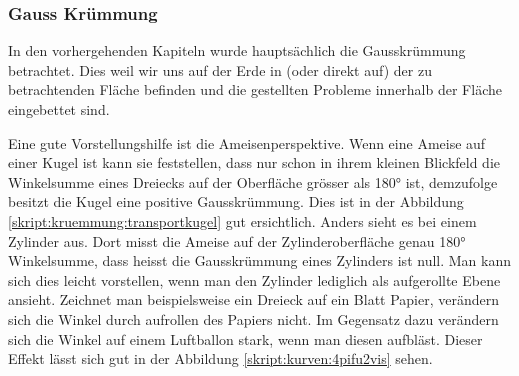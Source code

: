 \begin{refsection}




\subsubsection{Gauss Krümmung}
%
%
%
In den vorhergehenden Kapiteln wurde hauptsächlich die Gausskrümmung betrachtet.
Dies weil wir uns auf der Erde in (oder direkt auf) der zu betrachtenden Fläche befinden und die gestellten Probleme innerhalb der Fläche eingebettet sind.   

Eine gute Vorstellungshilfe ist die Ameisenperspektive. 
Wenn eine Ameise auf einer Kugel ist kann sie feststellen, dass nur schon in ihrem kleinen Blickfeld die Winkelsumme eines Dreiecks auf der Oberfläche grösser als 180° ist, demzufolge besitzt die Kugel eine positive Gausskrümmung. Dies ist in der Abbildung \ref{skript:kruemmung:transportkugel} gut ersichtlich. Anders sieht es bei einem Zylinder aus. Dort misst die Ameise auf der Zylinderoberfläche genau 180° Winkelsumme, dass heisst die Gausskrümmung eines Zylinders ist null. Man kann sich dies leicht vorstellen, wenn man den Zylinder lediglich als aufgerollte Ebene ansieht. Zeichnet man beispielsweise ein Dreieck auf ein Blatt Papier, verändern sich die Winkel durch aufrollen des Papiers nicht. Im Gegensatz dazu verändern sich die Winkel auf einem Luftballon stark, wenn man diesen aufbläst. Dieser Effekt lässt sich gut in der Abbildung \ref{skript:kurven:4pifu2vis} sehen.


\end{refsection}
